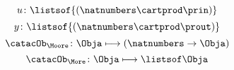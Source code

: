 {\begin{forslides}
\begin{equation}
            u\colon \listsof{(\natnumbers \cartprod \prin)}
        \end{equation}
        \begin{equation}
            \label{eq:ev-sign2}
            y\colon \listsof{(\natnumbers \cartprod \prout)}
        \end{equation}
        \begin{equation}
            \label{eq:phi-moore}
            {\catacOb_{\Moore}}\colon{\Obja}\longmapsto{(\natnumbers \to \Obja)}
        \end{equation}
        \begin{equation}
            \label{eq:phi-more}
            {\catacOb_{\More}}\colon{\Obja}\longmapsto{\listsof \Obja}
        \end{equation}
    \end{forslides}
}
